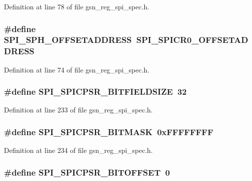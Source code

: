 Definition at line 78 of file gsn\_\-reg\_\-spi\_\-spec.h.

\hypertarget{a00573_a3d03a24de66d9d7c1a2c2a3e8a8c51a2}{
\subsubsection[{SPI\_\-SPH\_\-OFFSETADDRESS}]{\setlength{\rightskip}{0pt plus 5cm}\#define SPI\_\-SPH\_\-OFFSETADDRESS~SPI\_\-SPICR0\_\-OFFSETADDRESS}}
\label{a00573_a3d03a24de66d9d7c1a2c2a3e8a8c51a2}


Definition at line 74 of file gsn\_\-reg\_\-spi\_\-spec.h.

\hypertarget{a00573_ae54bc3c0dfcbd07df233cd16f9a358d9}{
\subsubsection[{SPI\_\-SPICPSR\_\-BITFIELDSIZE}]{\setlength{\rightskip}{0pt plus 5cm}\#define SPI\_\-SPICPSR\_\-BITFIELDSIZE~32}}
\label{a00573_ae54bc3c0dfcbd07df233cd16f9a358d9}


Definition at line 233 of file gsn\_\-reg\_\-spi\_\-spec.h.

\hypertarget{a00573_ab8f38409540b7c2942c7cace1662d743}{
\subsubsection[{SPI\_\-SPICPSR\_\-BITMASK}]{\setlength{\rightskip}{0pt plus 5cm}\#define SPI\_\-SPICPSR\_\-BITMASK~0xFFFFFFFF}}
\label{a00573_ab8f38409540b7c2942c7cace1662d743}


Definition at line 234 of file gsn\_\-reg\_\-spi\_\-spec.h.

\hypertarget{a00573_a8c6cc390e6f90292495052f014b67c5c}{
\subsubsection[{SPI\_\-SPICPSR\_\-BITOFFSET}]{\setlength{\rightskip}{0pt plus 5cm}\#define SPI\_\-SPICPSR\_\-BITOFFSET~0}}
\label{a00573_a8c6cc390e6f90292495052f014b67c5c}


